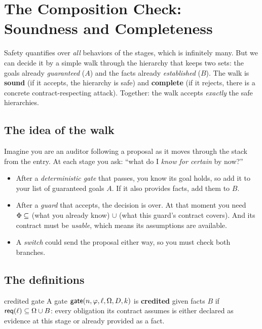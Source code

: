 \section{The Composition Check: Soundness and Completeness}
\label{ch:check}

\begin{bigidea}
Safety quantifies over \emph{all} behaviors of the stages, which is infinitely many. But we can decide it by a simple walk through the hierarchy that keeps two sets: the goals already \emph{guaranteed} ($A$) and the facts already \emph{established} ($B$). The walk is \textbf{sound} (if it accepts, the hierarchy is safe) and \textbf{complete} (if it rejects, there is a concrete contract-respecting attack). Together: the walk accepts \emph{exactly} the safe hierarchies.
\end{bigidea}

\subsection{The idea of the walk}

Imagine you are an auditor following a proposal as it moves through the stack from the entry. At each stage you ask: ``what do I \emph{know for certain} by now?''

\begin{itemize}
\item After a \emph{deterministic gate} that passes, you know its goal holds, so add it to your list of guaranteed goals $A$. If it also provides facts, add them to $B$.
\item After a \emph{guard} that accepts, the decision is over. At that moment you need $\Phi\subseteq$ (what you already know) $\cup$ (what this guard's contract covers). And its contract must be \emph{usable}, which means its assumptions are available.
\item A \emph{switch} could send the proposal either way, so you must check both branches.
\end{itemize}

\subsection{The definitions}

\begin{defbox}{credited gate}
A gate $\mathsf{gate}(n,\varphi,\ell,\Omega,D,k)$ is \textbf{credited} given facts $B$ if $\mathsf{req}(\ell)\subseteq\Omega\cup B$: every obligation its contract assumes is either declared as evidence at this stage or already provided as a fact.
\end{defbox}

